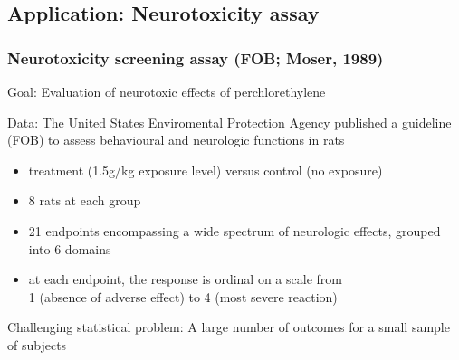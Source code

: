 \subsection{Application: Neurotoxicity assay}
\begin{frame}
\frametitle{Neurotoxicity screening assay (FOB; Moser, 1989)}

\textcolor{cambridgedarkorange}{Goal:} Evaluation of neurotoxic effects of perchlorethylene \\

\bigskip

\textcolor{cambridgedarkorange}{Data:} The United States Enviromental Protection Agency published a guideline (FOB) to assess behavioural and neurologic functions in rats

\begin{itemize}
\item  \textcolor{cambridgedarkblue}{treatment} (1.5g/kg exposure level) versus  \textcolor{cambridgedarkblue}{control} (no exposure)
\item  \textcolor{cambridgedarkblue}{8 rats} at each group
\item  \textcolor{cambridgedarkblue}{21 endpoints} encompassing a wide spectrum of neurologic effects, grouped into  \textcolor{cambridgedarkblue}{6 domains}
\item at each endpoint, the response is \textcolor{cambridgedarkblue}{ordinal} on a scale from \\
1 (absence of adverse effect) to 4 (most severe reaction)
\end{itemize}


\bigskip
\textcolor{cambridgedarkorange}{Challenging statistical problem:} A large number of outcomes for a small sample of subjects

\end{frame}
